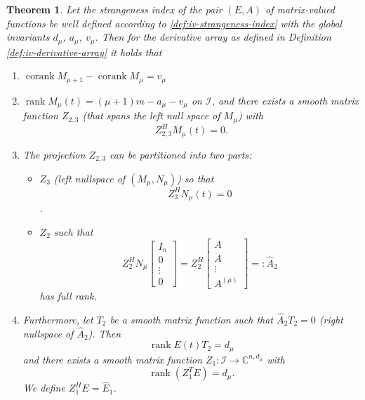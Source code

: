 \documentclass[]{book}
\providecommand{\tightlist}{%
  \setlength{\itemsep}{0pt}\setlength{\parskip}{0pt}}
\newtheorem{theorem}{Theorem}[chapter]
\theoremstyle{definition}
\theoremstyle{definition}
\theoremstyle{definition}
\theoremstyle{definition}
\theoremstyle{remark}
\begin{document}
\begin{theorem}
\protect\hypertarget{thm:iv-derivative-arrays-projections}{}{\label{thm:iv-derivative-arrays-projections} }Let the strangeness index of the pair \((E, A)\) of matrix-valued functions be well defined according to \ref{def:iv-strangeness-index} with the global invariants \(d_\mu\), \(a_\mu\), \(v_\mu\). Then for the derivative array as defined in Definition \ref{def:iv-derivative-array} it holds that

\begin{enumerate}
\def\labelenumi{\arabic{enumi}.}
\item
  \(\operatorname{corank}M_{\mu+1}- \operatorname{corank}M_\mu = v_\mu\)
\item
  \(\operatorname{rank}M_\mu(t) = (\mu+1)m-a_\mu - v_\mu\) on \(\mathcal I\), and there exists a smooth matrix function \(Z_{2,3}\) (that spans the left null space of \(M_\mu\)) with
  \[
   Z_{2,3}^H M_\mu(t) =0.
  \]
\item
  The projection \(Z_{2,3}\) can be partitioned into two parts:

  \begin{itemize}
  \tightlist
  \item
    \(Z_3\) (left nullspace of \((M_\mu, N_\mu)\)) so that \[Z_3^HN_\mu(t) =0\].
  \item
    \(Z_2\) such that
    \[
    Z_2^HN_\mu 
    \begin{bmatrix}
    I_n \\ 0 \\ \vdots \\ 0 
    \end{bmatrix}
    =
    Z_2^H
    \begin{bmatrix}
    A \\ \dot A \\ \vdots \\ A^{(\mu)}
    \end{bmatrix}
     =:\hat A_2
    \]
    has full rank.
  \end{itemize}
\item
  Furthermore, let \(T_2\) be a smooth matrix function such that \(\hat A_2 T_2=0\) (right nullspace of \(\hat A_2\)). Then
  \[
  \operatorname{rank}E(t) T_2 = d_\mu
  \]
  and there exists a smooth matrix function \(Z_1\colon \mathcal I \to \mathbb C^{n,d_\mu}\) with \[\operatorname{rank}(Z_1^TE) = d_\mu.\]
  We define \(Z_1^HE=\hat E_1\).
\end{enumerate}
\end{theorem}
\end{document}
